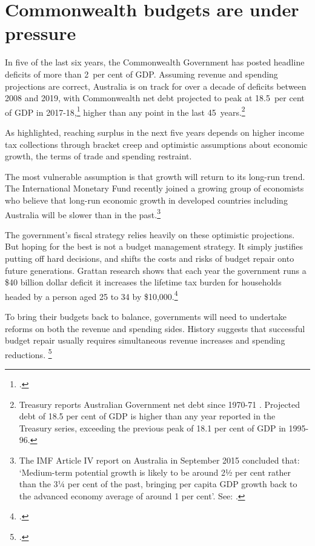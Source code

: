 \chapter{Commonwealth budgets are under pressure}
In five of the last six years, the Commonwealth Government has posted headline deficits of more than 2~per cent of GDP.
Assuming revenue and spending projections are correct, Australia is on track for over a decade of deficits between 2008 and 2019, with Commonwealth net debt projected to peak at 18.5~per cent of GDP in 2017-18,\footcite[][1]{Treasury2015MYEFO201516} higher than any point in the last 45~years.\footnote{Treasury reports Australian Government net debt since 1970-71 \textcite[273]{Treasury2014-MYEFO-2014-15}. Projected debt of 18.5 per cent of GDP is higher than any year reported in the Treasury series, exceeding the previous peak of 18.1 per cent of GDP in 1995-96.}
 
As  highlighted, reaching surplus in the next five years depends on higher income tax collections through bracket creep and optimistic assumptions about economic growth, the terms of trade and spending restraint.
 
The most vulnerable assumption is that growth will return to its long-run trend. The International Monetary Fund recently joined a growing group of economists who believe that long-run economic growth in developed countries including Australia will be slower than in the past.\footnote{The IMF Article IV report on Australia in September 2015 concluded that: ‘Medium-term potential growth is likely to be around 2½ per cent rather than the 3¼ per cent of the past, bringing per capita GDP growth back to the advanced economy average of around 1 per cent’. See: \textcite[][11]{IMF2015b}.}
 
 
The government’s fiscal strategy relies heavily on these optimistic projections. But hoping for the best is not a budget management strategy. It simply justifies putting off hard decisions, and shifts the costs and risks of budget repair onto future generations. Grattan research shows that each year the government runs a \$40 billion dollar deficit it increases the lifetime tax burden for households headed by a person aged 25 to 34 by \$10,000.\footcite[][9]{DaleyWoodWeidmannEtAl2014}
 
To bring their budgets back to balance, governments will need to undertake reforms on both the revenue and spending sides. History suggests that successful budget repair usually requires simultaneous revenue increases and spending reductions. \footcite[][16]{Daley2013}
 
